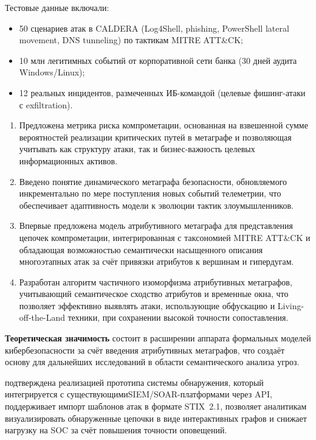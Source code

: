 Тестовые данные включали:
\begin{itemize}
    \item 50 сценариев атак в CALDERA (Log4Shell, phishing, PowerShell lateral movement, DNS tunneling) по тактикам MITRE ATT\&CK;
    \item 10 млн легитимных событий от корпоративной сети банка (30 дней аудита Windows/Linux);
    \item 12 реальных инцидентов, размеченных ИБ-командой (целевые фишинг-атаки с exfiltration).
\end{itemize}

{\novelty}
\begin{enumerate}[beginpenalty=10000] %
    \item Предложена метрика риска компрометации, основанная на взвешенной сумме вероятностей реализации критических путей в метаграфе и позволяющая учитывать как структуру атаки, так и бизнес-важность целевых информационных активов.
    \item Введено понятие динамического метаграфа безопасности, обновляемого инкрементально по мере поступления новых событий телеметрии, что обеспечивает адаптивность модели к эволюции тактик злоумышленников.
    \item Впервые предложена модель атрибутивного метаграфа для представления цепочек компрометации, интегрированная с таксономией MITRE ATT\&CK и обладающая возможностью семантически насыщенного описания многоэтапных атак за счёт привязки атрибутов к вершинам и гипердугам.
    \item Разработан алгоритм частичного изоморфизма атрибутивных метаграфов, учитывающий семантическое сходство атрибутов и временные окна, что позволяет эффективно выявлять атаки, использующие обфускацию и Living-off-the-Land техники, при сохранении высокой точности сопоставления.
\end{enumerate}

\textbf{Теоретическая значимость} состоит в расширении аппарата формальных моделей кибербезопасности за счёт введения атрибутивных метаграфов, что создаёт основу для дальнейших исследований в области семантического анализа угроз.

{\influence} подтверждена реализацией прототипа системы обнаружения, который интегрируется с существующими\linebreak SIEM/SOAR-платформами через API, поддерживает импорт шаблонов атак в формате STIX~2.1, позволяет аналитикам визуализировать обнаруженные цепочки в виде интерактивных графов и снижает нагрузку на SOC за счёт повышения точности оповещений.

